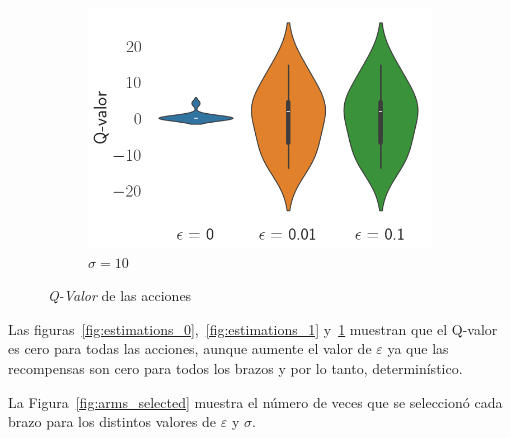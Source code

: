 \documentclass[12pt]{article}
\begin{document}
\begin{figure}[H]
\begin{subfigure}[H]{0.3\textwidth}
            \includegraphics[width=\textwidth]{../img/values_sigma_10}
            \caption{$\sigma=10$}
            \label{fig:estimations_2}
        \end{subfigure}

        \caption{\textit{Q-Valor} de las acciones}
        \label{fig:estimations}
    \end{figure}

    Las figuras~\ref{fig:estimations_0},~\ref{fig:estimations_1} y~\ref{fig:estimations_2} muestran que el Q-valor es cero para todas las acciones, aunque aumente el valor de $\varepsilon$ ya que las recompensas son cero para todos los brazos y por lo tanto, determinístico.

    La Figura~\ref{fig:arms_selected} muestra el número de veces que se seleccionó cada brazo para los distintos valores de $\varepsilon$ y $\sigma$.
\end{document}
